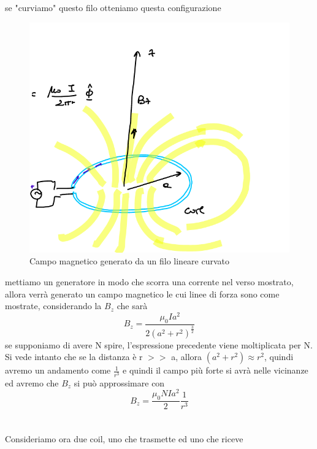 \documentclass[oneside, 12pt]{extbook}
\begin{document}
se "curviamo" questo filo otteniamo questa configurazione
\begin{figure}[!h]
	\includegraphics[scale=0.6]{immagini/solen.png}
	\caption{Campo magnetico generato da un filo lineare curvato}
\end{figure}
mettiamo un generatore in modo che scorra una corrente nel verso mostrato, allora verrà generato un campo magnetico le cui linee di forza sono come mostrate, considerando la $B_z$ che sarà
\begin{equation}
	B_z = \frac{\mu_0 I a^2}{2(a^2 + r^2)^{\frac{3}{2}}}
\end{equation}
se supponiamo di avere N spire, l'espressione precedente viene moltiplicata per N.\\Si vede intanto che se la distanza è r $>>$ a, allora $(a^2 + r^2) \approx r^2$, quindi avremo un andamento come $\frac{1}{r^3}$ e quindi il campo più forte si avrà nelle vicinanze ed avremo che $B_z$ si può approssimare con
\begin{equation}
	B_z = \frac{\mu_0 NI a^2}{2}\frac{1}{r^3}
\end{equation}
\\\\Consideriamo ora due coil, uno che trasmette ed uno che riceve \\
\end{document}
